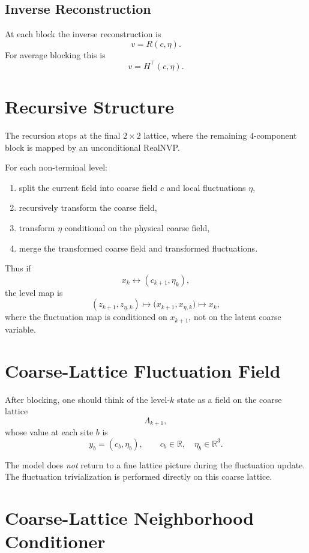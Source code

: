 \documentclass[11pt]{article}
\begin{document}
\subsection{Inverse Reconstruction}

At each block the inverse reconstruction is
\[
v = R(c,\eta).
\]
For average blocking this is
\[
v = H^\top(c,\eta).
\]

\section{Recursive Structure}

The recursion stops at the final $2\times 2$ lattice, where the remaining
$4$-component block is mapped by an unconditional RealNVP.

For each non-terminal level:
\begin{enumerate}
\item split the current field into coarse field $c$ and local fluctuations
$\eta$,
\item recursively transform the coarse field,
\item transform $\eta$ conditional on the physical coarse field,
\item merge the transformed coarse field and transformed fluctuations.
\end{enumerate}

Thus if
\[
x_k \longleftrightarrow (c_{k+1},\eta_k),
\]
the level map is
\[
(z_{k+1},z_{\eta,k})
\mapsto
\bigl(x_{k+1},x_{\eta,k}\bigr)
\mapsto
x_k,
\]
where the fluctuation map is conditioned on $x_{k+1}$, not on the latent
coarse variable.

\section{Coarse-Lattice Fluctuation Field}

After blocking, one should think of the level-$k$ state as a field on the
coarse lattice
\[
\Lambda_{k+1},
\]
whose value at each site $b$ is
\[
y_b = (c_b,\eta_b),
\qquad
c_b\in\mathbb{R},\quad
\eta_b\in\mathbb{R}^3.
\]

The model does \emph{not} return to a fine lattice picture during the
fluctuation update. The fluctuation trivialization is performed directly on
this coarse lattice.

\section{Coarse-Lattice Neighborhood Conditioner}
\end{document}
